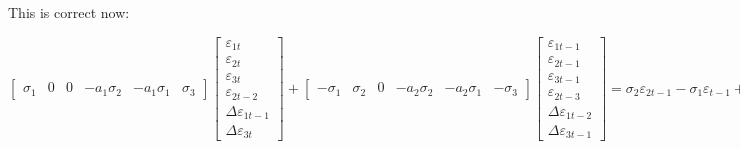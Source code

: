 \documentclass[a4paper,12pt]{article}
\begin{document}
\bigskip

\bigskip

\bigskip


This is correct now:

$%
\begin{bmatrix}
\sigma _{1} & 0 & 0 & -a_{1}\sigma _{2} & -a_{1}\sigma _{1} & \sigma _{3}%
\end{bmatrix}%
\begin{bmatrix}
\varepsilon _{1t} \\ 
\varepsilon _{2t} \\ 
\varepsilon _{3t} \\ 
\varepsilon _{2t-2} \\ 
\Delta \varepsilon _{1t-1} \\ 
\Delta \varepsilon _{3t}%
\end{bmatrix}%
+%
\begin{bmatrix}
-\sigma _{1} & \sigma _{2} & 0 & -a_{2}\sigma _{2} & -a_{2}\sigma _{1} & 
-\sigma _{3}%
\end{bmatrix}%
\begin{bmatrix}
\varepsilon _{1t-1} \\ 
\varepsilon _{2t-1} \\ 
\varepsilon _{3t-1} \\ 
\varepsilon _{2t-3} \\ 
\Delta \varepsilon _{1t-2} \\ 
\Delta \varepsilon _{3t-1}%
\end{bmatrix}%
=\allowbreak \sigma _{2}\varepsilon _{2t-1}-\sigma _{1}\varepsilon
_{t-1}+\sigma _{1}\varepsilon _{t}+\Delta \sigma _{3}\varepsilon
_{3t}-\Delta \sigma _{3}\varepsilon _{3t-1}-\sigma _{2}a_{1}\varepsilon
_{2t-2}-\sigma _{2}a_{2}\varepsilon _{2t-3}-\Delta \sigma
_{1}a_{1}\varepsilon _{t-1}-\Delta \sigma _{1}a_{2}\varepsilon
_{t-2}\allowbreak $

\EAW

\bigskip
\end{document}
